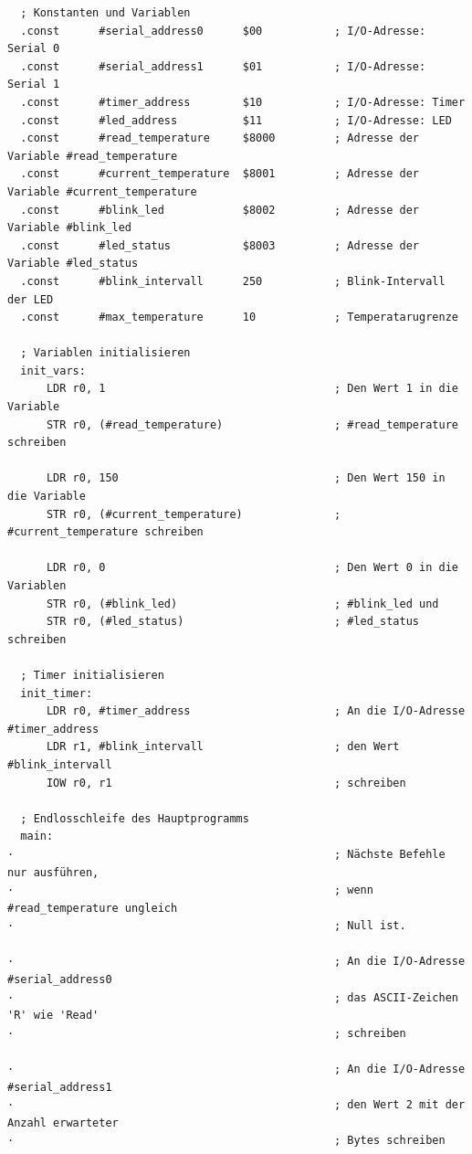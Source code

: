 {
\footnotesize

\begin{verbatim}
  ; Konstanten und Variablen
  .const      #serial_address0      $00           ; I/O-Adresse: Serial 0
  .const      #serial_address1      $01           ; I/O-Adresse: Serial 1
  .const      #timer_address        $10           ; I/O-Adresse: Timer
  .const      #led_address          $11           ; I/O-Adresse: LED
  .const      #read_temperature     $8000         ; Adresse der Variable #read_temperature
  .const      #current_temperature  $8001         ; Adresse der Variable #current_temperature
  .const      #blink_led            $8002         ; Adresse der Variable #blink_led
  .const      #led_status           $8003         ; Adresse der Variable #led_status
  .const      #blink_intervall      250           ; Blink-Intervall der LED
  .const      #max_temperature      10            ; Temperatarugrenze

  ; Variablen initialisieren
  init_vars:
      LDR r0, 1                                   ; Den Wert 1 in die Variable
      STR r0, (#read_temperature)                 ; #read_temperature schreiben

      LDR r0, 150                                 ; Den Wert 150 in die Variable
      STR r0, (#current_temperature)              ; #current_temperature schreiben

      LDR r0, 0                                   ; Den Wert 0 in die Variablen
      STR r0, (#blink_led)                        ; #blink_led und
      STR r0, (#led_status)                       ; #led_status schreiben

  ; Timer initialisieren
  init_timer:
      LDR r0, #timer_address                      ; An die I/O-Adresse #timer_address
      LDR r1, #blink_intervall                    ; den Wert #blink_intervall
      IOW r0, r1                                  ; schreiben

  ; Endlosschleife des Hauptprogramms
  main:
·                                                 ; Nächste Befehle nur ausführen,
·                                                 ; wenn #read_temperature ungleich
·                                                 ; Null ist.

·                                                 ; An die I/O-Adresse #serial_address0
·                                                 ; das ASCII-Zeichen 'R' wie 'Read'
·                                                 ; schreiben

·                                                 ; An die I/O-Adresse #serial_address1
·                                                 ; den Wert 2 mit der Anzahl erwarteter
·                                                 ; Bytes schreiben


\end{verbatim}}

